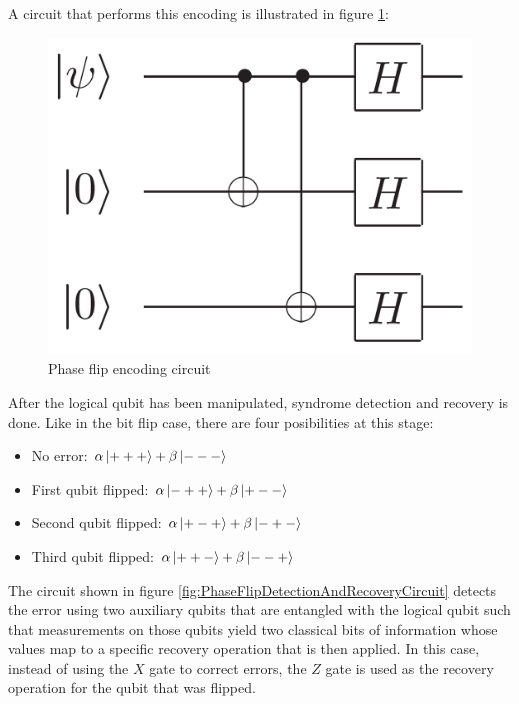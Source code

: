 A circuit that performs this encoding is illustrated in figure \ref{fig:PhaseFlipEncodingCircuit}:

\begin{figure}[h!]
    \centering
    \includegraphics[scale=.25]{images/ErrorCorrection-PhaseFlipEncodingCircuit.png}
    \caption{Phase flip encoding circuit \cite{NielsenChuang_2012}}
    \label{fig:PhaseFlipEncodingCircuit}
\end{figure}

After the logical qubit has been manipulated, syndrome detection and recovery is done. Like in the bit flip case, there are four posibilities at this stage:
\begin{itemize}[noitemsep]
    \item No error: $\alpha\left|{+++}\right\rangle+\beta\left|{---}\right\rangle$
    \item First qubit flipped: $\alpha\left|{-++}\right\rangle+\beta\left|{+--}\right\rangle$
    \item Second qubit flipped: $\alpha\left|{+-+}\right\rangle+\beta\left|{-+-}\right\rangle$
    \item Third qubit flipped: $\alpha\left|{++-}\right\rangle+\beta\left|{--+}\right\rangle$
\end{itemize}

The circuit shown in figure \ref{fig:PhaseFlipDetectionAndRecoveryCircuit} detects the error using two auxiliary qubits that are entangled with the logical qubit such that measurements on those qubits yield two classical bits of information whose values map to a specific recovery operation that is then applied. In this case, instead of using the $X$ gate to correct errors, the $Z$ gate is used as the recovery operation for the qubit that was flipped.

